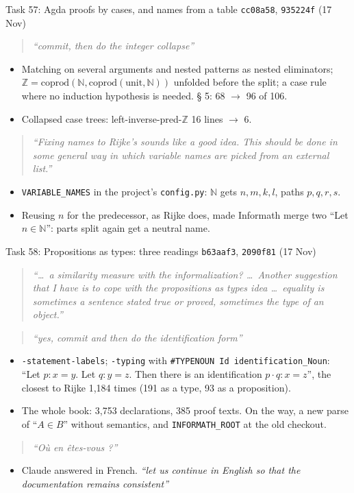 \documentclass[10pt,aspectratio=169]{beamer}
\newcommand{\bad}[1]{\textcolor{warn}{#1}}
\newcommand{\ok}[1]{\textcolor{good}{#1}}
\newcommand{\commit}[1]{\texttt{\footnotesize #1}}
\newcommand{\prompt}[1]{\begin{quote}\small\itshape ``#1''\end{quote}}
\begin{document}
\begin{frame}{Task 57: Agda proofs by cases, and names from a table}
  \commit{cc08a58}, \commit{935224f} (17 Nov)
  \prompt{commit, then do the integer collapse}
  \begin{itemize}\small
    \item Matching on several arguments and nested patterns as nested eliminators;
          $\mathbb{Z} = \mathrm{coprod}(\mathbb{N}, \mathrm{coprod}(\mathrm{unit}, \mathbb{N}))$ unfolded before the split; a case
          rule where no induction hypothesis is needed. § 5: 68 $\to$ \ok{96} of 106.
    \item Collapsed case trees: left-inverse-pred-$\mathbb{Z}$ \ok{16 lines $\to$ 6}.
  \end{itemize}
  \prompt{Fixing names to Rijke's sounds like a good idea. This should be done in some general way
  in which variable names are picked from an external list.}
  \begin{itemize}\small
    \item \texttt{VARIABLE\_NAMES} in the project's \texttt{config.py}: $\mathbb{N}$ gets
          $n, m, k, l$, paths $p, q, r, s$.
    \item Reusing $n$ for the predecessor, as Rijke does, made Informath \bad{merge two
          ``Let $n \in \mathbb{N}$''}: parts split again get a neutral name.
  \end{itemize}
\end{frame}

\begin{frame}{Task 58: Propositions as types: three readings}
  \commit{b63aaf3}, \commit{2090f81} (17 Nov)
  \prompt{\ldots\ a similarity measure with the informalization? \ldots\ Another suggestion that I have
  is to cope with the propositions as types idea \ldots\ equality is sometimes a sentence stated
  true or proved, sometimes the type of an object.}
  \prompt{yes, commit and then do the identification form}
  \begin{itemize}\small
    \item \texttt{-statement-labels}; \texttt{-typing} with \texttt{\#TYPENOUN Id identification\_Noun}:
          \ok{``Let $p : x = y$. Let $q : y = z$. Then there is an identification
          $p \cdot q : x = z$''}, the closest to Rijke 1,184 times (191 as a type, 93 as a
          proposition).
    \item The whole book: 3,753 declarations, 385 proof texts. On the way, \bad{a new parse of
          ``$A \in B$''} without semantics, and \texttt{INFORMATH\_ROOT} at the old checkout.
  \end{itemize}
  \prompt{Où en êtes-vous ?}
  \begin{itemize}\small
    \item Claude answered in French. \emph{``let us continue in English so that the
          documentation remains consistent''}
  \end{itemize}
\end{frame}
\end{document}
